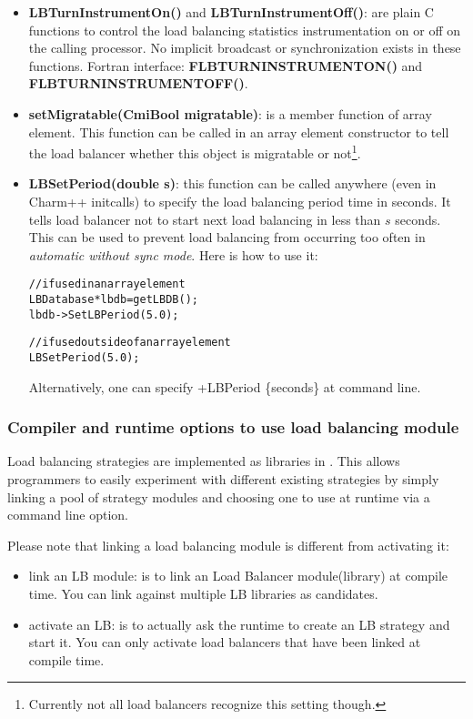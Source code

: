 \begin{itemize}
\item {\bf LBTurnInstrumentOn()} and {\bf LBTurnInstrumentOff()}: are plain C
      functions to control the load balancing statistics instrumentation
      on or off on the calling processor. No implicit broadcast or 
      synchronization exists in these functions.
      Fortran interface: {\bf FLBTURNINSTRUMENTON()} and {\bf FLBTURNINSTRUMENTOFF()}.
\item {\bf setMigratable(CmiBool migratable)}: is a member function of array
      element. This function can be called 
      in an array element constructor to tell the load balancer whether this object
      is migratable or not\footnote{Currently not all load balancers 
      recognize this setting though.}.
\item {\bf LBSetPeriod(double s)}: this function can be called
      anywhere (even in Charm++ initcalls) to specify 
      the load balancing period time in seconds. 
      It tells load balancer not to start next 
      load balancing in less than $s$ seconds. This can be used to prevent 
      load balancing from occurring too often in 
      {\em automatic without sync mode}. Here is how to use it:
      \begin{alltt}
// if used in an array element
LBDatabase *lbdb = getLBDB();
lbdb->SetLBPeriod(5.0);

// if used outside of an array element
LBSetPeriod(5.0);
\end{alltt}
      Alternatively, one can specify +LBPeriod \{seconds\} at command line.
\end{itemize}

\subsubsection{Compiler and runtime options to use load balancing module}

\label{lbOption}

Load balancing strategies are implemented as libraries in \charmpp{}. This
allows programmers to easily experiment with different existing strategies 
by simply linking a pool of strategy modules and choosing
one to use at runtime via a command line option.

Please note that linking a load balancing module is different from activating it:
\begin{itemize}
\item link an LB module: is to link an Load Balancer module(library) at 
   compile time. You can link against multiple LB libraries as candidates.
\item activate an LB: is to actually ask the runtime to create an LB strategy and 
   start it. You can only activate load balancers that have been linked at
   compile time.
\end{itemize}


